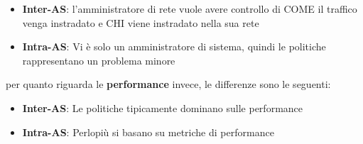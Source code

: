 \documentclass[12pt]{article}
\begin{document}
\begin{itemize}
    \item \textbf{Inter-AS}: l'amministratore di rete vuole avere controllo di COME il traffico venga instradato e CHI viene instradato nella sua rete
    \item \textbf{Intra-AS}: Vi è solo un amministratore di sistema, quindi le politiche rappresentano un problema minore
\end{itemize}
per quanto riguarda le \textbf{performance} invece, le differenze sono le seguenti:
\begin{itemize}
    \item \textbf{Inter-AS}: Le politiche tipicamente dominano sulle performance
    \item \textbf{Intra-AS}: Perlopiù si basano su metriche di performance
\end{itemize}
\end{document}
